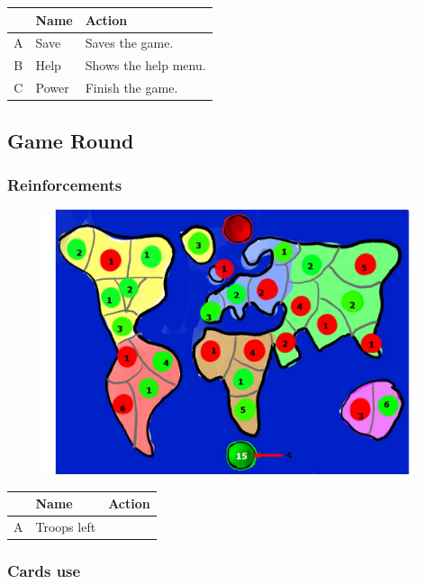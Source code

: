 \documentclass[12pt,a4paper]{article}
\begin{document}
\begin{table}[H]
\small
\centering
\begin{tabular}{c|p{5cm}|p{7cm}}
& Name & Action \\ \hline\hline
A
&Save
&Saves the game.
\\B
&Help
&Shows the help menu.
\\C
&Power
&Finish the game.
\end{tabular}
\end{table}

\subsection{Game Round}\label{mock:75}

\subsubsection{Reinforcements}\label{mock:751}

\begin{figure}[H]
  \centering
  \includegraphics[width=11cm]{pic/mocks/5-1.pdf}
\end{figure}

\begin{table}[H]
\small
\centering
\begin{tabular}{c|p{5cm}|p{7cm}}
& Name & Action \\ \hline\hline
A
&Troops left
\end{tabular}
\end{table}

\subsubsection{Cards use}\label{mock:752}
\end{document}
